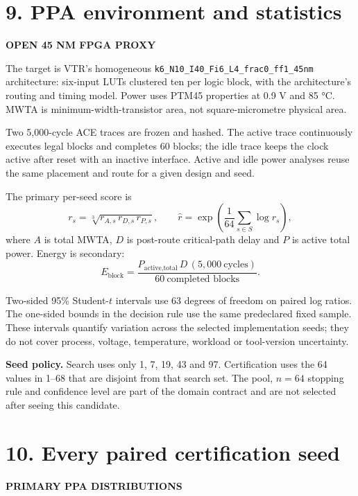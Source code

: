 \documentclass[10pt,a4paper]{article}
\newcommand{\smallcaps}[1]{\textcolor{Mid}{\fontsize{8.5}{10}\selectfont\bfseries\MakeUppercase{#1}}}
\newcommand{\newpageheading}[2]{\clearpage\section{#1}\smallcaps{#2}\vspace{6pt}}
\begin{document}
\newpageheading{9. PPA environment and statistics}{Open 45 nm FPGA proxy}

The target is VTR's homogeneous \texttt{k6\_N10\_I40\_Fi6\_L4\_frac0\_ff1\_45nm} architecture: six-input LUTs clustered ten per logic block, with the architecture's routing and timing model. Power uses PTM45 properties at 0.9 V and 85 °C. MWTA is minimum-width-transistor area, not square-micrometre physical area.

Two 5,000-cycle ACE traces are frozen and hashed. The active trace continuously executes legal blocks and completes 60 blocks; the idle trace keeps the clock active after reset with an inactive interface. Active and idle power analyses reuse the same placement and route for a given design and seed.

The primary per-seed score is
\[
r_s=\sqrt[3]{r_{A,s}\,r_{D,s}\,r_{P,s}},
\qquad
\widehat r=\exp\!\left(\frac{1}{64}\sum_{s\in S}\log r_s\right),
\]
where $A$ is total MWTA, $D$ is post-route critical-path delay and $P$ is active total power. Energy is secondary:
\[
E_{\text{block}}=
\frac{P_{\text{active,total}}\,D\,(5{,}000\ \text{cycles})}{60\ \text{completed blocks}}.
\]

Two-sided 95\% Student-$t$ intervals use 63 degrees of freedom on paired log ratios. The one-sided bounds in the decision rule use the same predeclared fixed sample. These intervals quantify variation across the selected implementation seeds; they do not cover process, voltage, temperature, workload or tool-version uncertainty.

\begin{scopebox}
\textbf{Seed policy.} Search uses only 1, 7, 19, 43 and 97. Certification uses the 64 values in 1--68 that are disjoint from that search set. The pool, $n=64$ stopping rule and confidence level are part of the domain contract and are not selected after seeing this candidate.
\end{scopebox}

\newpageheading{10. Every paired certification seed}{Primary PPA distributions}
\end{document}
